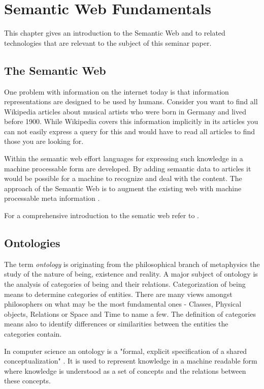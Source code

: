 \chapter{Semantic Web Fundamentals}
This chapter gives an introduction to the Semantic Web and to related 
technologies that are relevant to the subject of this seminar paper.

\section{The Semantic Web}
One problem with information on the internet today is that information
representations are designed to be used by humans. Consider you want to find all Wikipedia articles
about musical artists who were born in Germany and lived before 1900.
While Wikipedia covers this information
implicitly in its articles you can not easily express a query for this and
would have to read all articles to find those you are looking for.

Within the semantic web effort languages for expressing such knowledge
in a machine processable form are developed.
By adding semantic data to articles it would be possible for a machine
to recognize and deal with the content.  The approach of the
Semantic Web is to augment the existing web with machine processable meta information \cite{berners-lee98}.

For a comprehensive introduction to the sematic web refer to \cite{AntoniouHarmelen08}.

\section{Ontologies}
The term \emph{ontology} is originating from the philosophical branch of metaphysics the 
study of the nature of being, existence and reality. A major subject of ontology is the analysis
of categories of being and their relations.
Categorization of being means to determine categories of entities. There are many views amongst
philosophers on what may be the most fundamental ones - Classes, Physical objects, Relations or
Space and Time to name a few.
The definition of categories means also to identify differences or similarities between the entities
the categories contain.

In computer science an ontology is a "formal, explicit specification of a shared conceptualization"
\cite{gruber1993}. It is used to represent knowledge in a machine readable form where knowledge
is understood as a set of concepts and the relations between these concepts.

